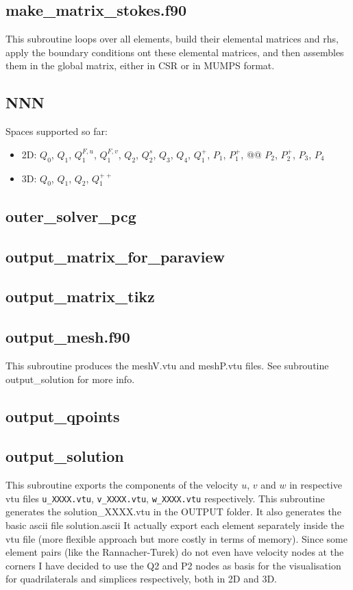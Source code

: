  \subsection{make\_matrix\_stokes.f90}
 This subroutine loops over all elements, build their elemental matrices and rhs, 
 apply the boundary conditions ont these elemental matrices, and then 
 assembles them in the global matrix, either in CSR or in MUMPS format.
 \subsection{NNN}
 Spaces supported so far:
 \begin{itemize}
 \item 2D: $Q_0$, $Q_1$, $Q_1^{F,u}$, $Q_1^{F,v}$, $Q_2$, $Q_2^s$, $Q_3$, $Q_4$, 
 $Q_1^+$, $P_1$, $P_1^+$, @@ $P_2$, $P_2^+$, $P_3$, $P_4$
 \item 3D: $Q_0$, $Q_1$, $Q_2$, $Q_1^{++}$
 \end{itemize}
 \subsection{outer\_solver\_pcg}
 \subsection{output\_matrix\_for\_paraview}

 \subsection{output\_matrix\_tikz}

 \subsection{output\_mesh.f90}
 This subroutine produces the {\filenamefont meshV.vtu} and {\filenamefont meshP.vtu} files. 
 See subroutine output\_solution for more info.
 \subsection{output\_qpoints}

 \subsection{output\_solution}
 This subroutine exports the components of the velocity $u$, $v$ and $w$ in respective vtu 
 files {\tt u\_XXXX.vtu}, {\tt v\_XXXX.vtu}, {\tt w\_XXXX.vtu} respectively. 
 This subroutine generates the {\filenamefont solution\_XXXX.vtu} in the {\foldernamefont OUTPUT}
 folder. It also generates the basic ascii file {\filenamefont solution.ascii}
 It actually export each element separately inside the vtu file (more flexible approach
 but more costly in terms of memory).
 Since some element pairs (like the Rannacher-Turek) do not even have velocity nodes at the 
 corners I have decided to use the Q2 and P2 nodes as basis for the visualisation for 
 quadrilaterals and simplices respectively, both in 2D and 3D.
